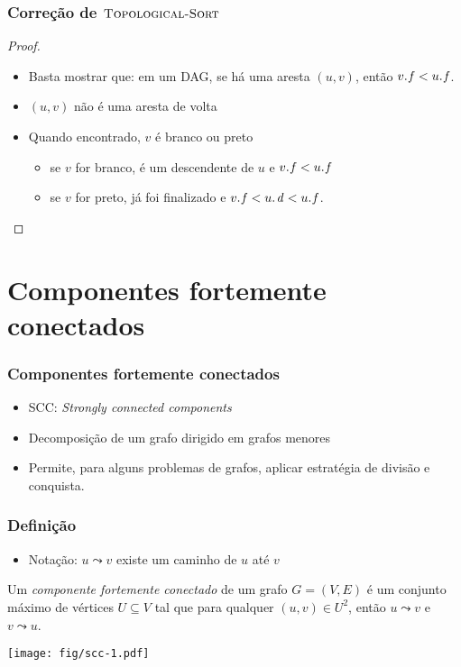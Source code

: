 \documentclass{beamer}
\begin{document}
\begin{frame}
\frametitle{Correção de $\textnormal{\scshape Topological-Sort}$}

\begin{proof}
\begin{itemize}
\item Basta mostrar que: em um DAG, se há uma aresta $(u, v)$, então $\attrib{v}{f} < \attrib{u}{f}$.
\item $(u, v)$ não é uma aresta de volta
\item Quando encontrado, $v$ é branco ou preto
\begin{itemize}
\item se $v$ for branco, é um descendente de $u$ e $\attrib{v}{f} < \attrib{u}{f}$
\item se $v$ for preto, já foi finalizado e $\attrib{v}{f} < \attrib{u}{d} < \attrib{u}{f}$.
\end{itemize}
\end{itemize}
\end{proof}
\end{frame}

\section{Componentes fortemente conectados}

\begin{frame}
\frametitle{Componentes fortemente conectados}
\begin{itemize}
\item \alert{SCC}: \textit{Strongly connected components}
\item Decomposição de um grafo dirigido em grafos menores
\item Permite, para alguns problemas de grafos, aplicar estratégia de
  divisão e conquista.
\end{itemize}
\end{frame}

\begin{frame}

\frametitle{Definição}

\begin{itemize}
\item Notação: $u \leadsto v$ existe um caminho de $u$ até $v$
\end{itemize}

\begin{definition}
Um \emph{componente fortemente conectado} de um grafo $G = (V, E)$ é um
conjunto máximo de vértices $U \subseteq V$ tal que para qualquer $(u, v) \in U^2$,
então $u \leadsto v$ e $v \leadsto u$.
\end{definition}

\begin{center}
\texttt{[image: fig/scc-1.pdf]}
\end{center}
\end{frame}
\end{document}
